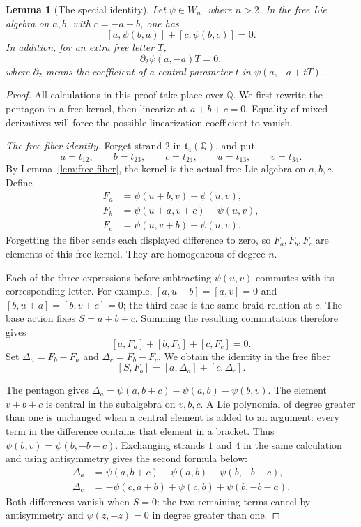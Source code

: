 \documentclass[11pt]{article}
\newcommand{\Q}{\mathbb Q}
\newtheorem{lemma}[theorem]{Lemma}
\theoremstyle{definition}
\theoremstyle{remark}
\numberwithin{equation}{section}
\begin{document}
\begin{lemma}[The special identity]\label{lem:special}
Let \(\psi\in W_n\), where \(n>2\).  In the free Lie algebra on
\(a,b\), with \(c=-a-b\), one has
\begin{equation}\label{eq:special}
 [a,\psi(b,a)]+[c,\psi(b,c)]=0.
\end{equation}
In addition, for an extra free letter \(T\),
\begin{equation}\label{eq:special-linearization}
 \partial_2\psi(a,-a)T=0,
\end{equation}
where \(\partial_2\) means the coefficient of a central parameter
\(t\) in \(\psi(a,-a+tT)\).
\end{lemma}
\begin{proof}
All calculations in this proof take place over \(\Q\).  We first
rewrite the pentagon in a free kernel, then linearize at \(a+b+c=0\).
Equality of mixed derivatives will force the possible linearization
coefficient to vanish.

\emph{The free-fiber identity.}
Forget strand \(2\) in \(\mathfrak t_4(\Q)\), and put
\[
 a=t_{12},\qquad b=t_{23},\qquad c=t_{24},\qquad
 u=t_{13},\qquad v=t_{34}.
\]
By Lemma~\ref{lem:free-fiber}, the kernel is the actual free Lie
algebra on \(a,b,c\).  Define
\begin{align*}
 F_a&=\psi(u+b,v)-\psi(u,v),\\
 F_b&=\psi(u+a,v+c)-\psi(u,v),\\
 F_c&=\psi(u,v+b)-\psi(u,v).
\end{align*}
Forgetting the fiber sends each displayed difference to zero, so
\(F_a,F_b,F_c\) are elements of this free kernel.  They are
homogeneous of degree \(n\).

Each of the three expressions before subtracting \(\psi(u,v)\)
commutes with its corresponding letter.  For example,
\([a,u+b]=[a,v]=0\) and
\([b,u+a]=[b,v+c]=0\); the third case is the same braid relation at
\(c\).  The base action fixes \(S=a+b+c\).  Summing the resulting
commutators therefore gives
\[
 [a,F_a]+[b,F_b]+[c,F_c]=0.
\]
Set \(\Delta_a=F_b-F_a\) and \(\Delta_c=F_b-F_c\).  We obtain the
identity in the free fiber
\begin{equation}\label{eq:special-fiber}
 [S,F_b]=[a,\Delta_a]+[c,\Delta_c].
\end{equation}

The pentagon gives
\(\Delta_a=\psi(a,b+c)-\psi(a,b)-\psi(b,v)\).
The element \(v+b+c\) is central in the subalgebra on \(v,b,c\).
A Lie polynomial of degree greater than one is unchanged when a
central element is added to an argument: every term in the difference
contains that element in a bracket.  Thus \(\psi(b,v)=\psi(b,-b-c)\).
Exchanging strands \(1\) and \(4\) in the same calculation and using
antisymmetry gives the second formula below:
\begin{align}
 \Delta_a&=\psi(a,b+c)-\psi(a,b)-\psi(b,-b-c),
       \label{eq:special-delta-a}\\
 \Delta_c&=-\psi(c,a+b)+\psi(c,b)+\psi(b,-b-a).
       \label{eq:special-delta-c}
\end{align}
Both differences vanish when \(S=0\): the two remaining terms cancel
by antisymmetry and \(\psi(z,-z)=0\) in degree greater than one.


\end{proof}
\end{document}
